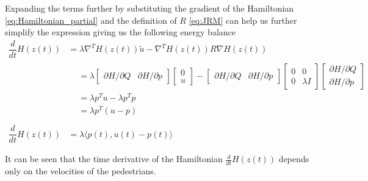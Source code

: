 Expanding the terms further by substituting the gradient of the Hamiltonian \autoref{eq:Hamiltonian_partial} and the definition of $R$ \autoref{eq:JRM} can help us further simplify the expression giving us the following energy balance
\begin{align}
    \dfrac{d}{dt}H(z(t)) &= \lambda \nabla^T H(z(t)) \tilde u - \nabla^T H(z(t)) R \nabla H(z(t)) \nonumber \\
    &\begin{aligned}
        &= \lambda 
        \begin{bmatrix}
        \partial H / \partial Q & \partial H / \partial p
        \end{bmatrix}
        \begin{bmatrix}
            0 \\
            u
        \end{bmatrix}
        - 
        \begin{bmatrix}
        \partial H / \partial Q & \partial H / \partial p
        \end{bmatrix}
        \begin{bmatrix}
            0 & 0 \\ 0 & \lambda I
        \end{bmatrix}
        \begin{bmatrix}
        \partial H / \partial Q \\ \partial H / \partial p
        \end{bmatrix}  \\ 
        &= \lambda p^T u - \lambda  p^T p \\ 
        &= \lambda p^T (u - p) \\ 
    \end{aligned} \nonumber \\
    \dfrac{d}{dt}H(z(t))&= \lambda \langle p(t),u(t)-p(t) \rangle
    \label{eq:dH}
\end{align}


It can be seen that the time derivative of the Hamiltonian $\frac{d}{dt}H(z(t))$ depends only on the velocities of the pedestrians.

